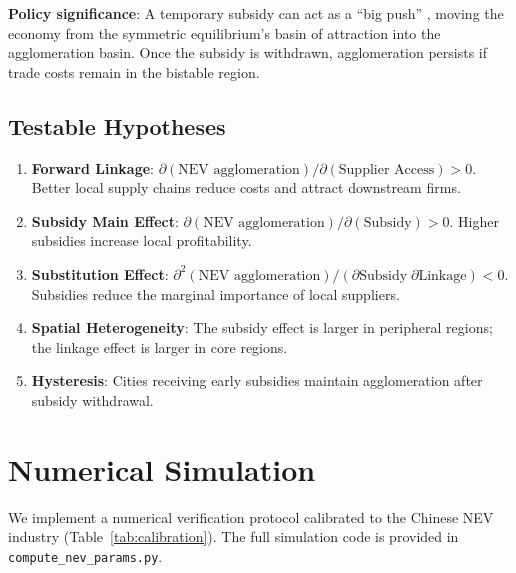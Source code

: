 \documentclass[11pt,a4paper]{article}
\begin{document}
\textbf{Policy significance}: A temporary subsidy can act as a ``big push'' \citep{murphy1989industrialization}, moving the economy from the symmetric equilibrium's basin of attraction into the agglomeration basin. Once the subsidy is withdrawn, agglomeration persists if trade costs remain in the bistable region.

\subsection{Testable Hypotheses}

\begin{enumerate}[label=\textbf{H\arabic*:}, leftmargin=*]
    \item \textbf{Forward Linkage}: $\partial (\text{NEV agglomeration}) / \partial (\text{Supplier Access}) > 0$. Better local supply chains reduce costs and attract downstream firms.
    \item \textbf{Subsidy Main Effect}: $\partial (\text{NEV agglomeration}) / \partial (\text{Subsidy}) > 0$. Higher subsidies increase local profitability.
    \item \textbf{Substitution Effect}: $\partial^2 (\text{NEV agglomeration}) / (\partial \text{Subsidy} \; \partial \text{Linkage}) < 0$. Subsidies reduce the marginal importance of local suppliers.
    \item \textbf{Spatial Heterogeneity}: The subsidy effect is larger in peripheral regions; the linkage effect is larger in core regions.
    \item \textbf{Hysteresis}: Cities receiving early subsidies maintain agglomeration after subsidy withdrawal.
\end{enumerate}

\section{Numerical Simulation}

We implement a numerical verification protocol calibrated to the Chinese NEV industry (Table~\ref{tab:calibration}). The full simulation code is provided in \texttt{compute\_nev\_params.py}.
\end{document}
